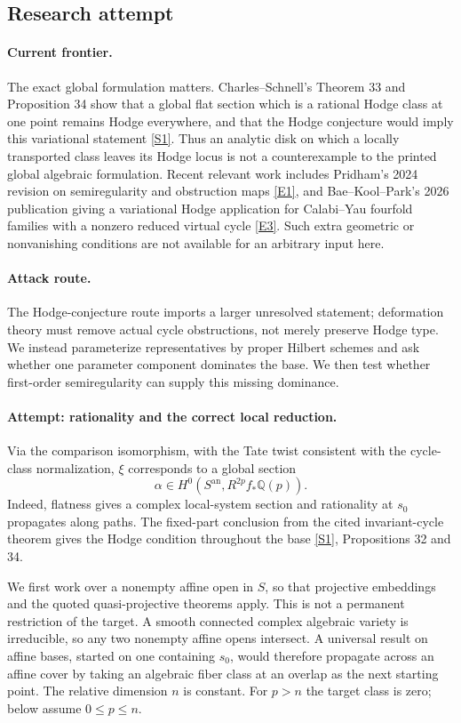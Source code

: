 \documentclass[11pt,a4paper]{article}
\newcommand{\Q}{\mathbb{Q}}
\newcommand{\sref}[2]{\hyperlink{source:#1:#2}{[S#2]}}
\newcommand{\eref}[2]{\hyperlink{extra:#1:#2}{[E#2]}}
\numberwithin{equation}{section}
\begin{document}
\subsection{Research attempt}

\paragraph{Current frontier.}
The exact global formulation matters. Charles--Schnell's Theorem 33 and
Proposition 34 show that a global flat section which is a rational Hodge
class at one point remains Hodge everywhere, and that the Hodge conjecture
would imply this variational statement \sref{157}{1}. Thus an analytic
disk on which a locally transported class leaves its Hodge locus is not a
counterexample to the printed global algebraic formulation. Recent relevant
work includes Pridham's 2024 revision on semiregularity and obstruction
maps \eref{157}{1}, and Bae--Kool--Park's 2026 publication giving a
variational Hodge application for Calabi--Yau fourfold families with a
nonzero reduced virtual cycle \eref{157}{3}. Such extra geometric or
nonvanishing conditions are not available for an arbitrary input here.

\paragraph{Attack route.}
The Hodge-conjecture route imports a larger unresolved statement; deformation
theory must remove actual cycle obstructions, not merely preserve Hodge type.
We instead parameterize representatives by proper Hilbert schemes and ask
whether one parameter component dominates the base. We then test whether
first-order semiregularity can supply this missing dominance.

\paragraph{Attempt: rationality and the correct local reduction.}
Via the comparison isomorphism, with the Tate twist consistent with the
cycle-class normalization, $\xi$ corresponds to a global section
\[
 \alpha\in H^0(S^{\mathrm{an}},R^{2p}f_*\Q(p)).
\]
Indeed, flatness gives a complex local-system section and rationality at
$s_0$ propagates along paths. The fixed-part conclusion from the cited
invariant-cycle theorem gives the Hodge condition throughout the base
\sref{157}{1}, Propositions 32 and 34.

We first work over a nonempty affine open in $S$, so that projective
embeddings and the quoted quasi-projective theorems apply. This is not a
permanent restriction of the target. A smooth connected complex algebraic
variety is irreducible, so any two nonempty affine opens intersect. A
universal result on affine bases, started on one containing $s_0$, would
therefore propagate across an affine cover by taking an algebraic fiber
class at an overlap as the next starting point. The relative dimension
$n$ is constant. For $p>n$ the target class is zero; below assume
$0\le p\le n$.
\end{document}
